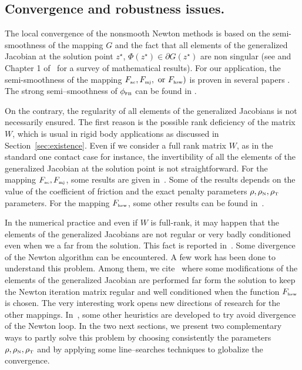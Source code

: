 \subsection{Convergence and robustness issues.}


The local convergence of the nonsmooth Newton methods is based on the semi-smoothness of the mapping $G$ and the fact that all elements of the generalized Jacobian at the solution point $z^\star$,  $\Phi(z^\star) \in \partial G(z^\star)$ are non singular (see \cite{Qi.Sun1993} and Chapter 1 of~\cite{Qi.ea_Book2018} for a survey of mathematical results). For our application, the semi-smoothness of the mapping $F_{\hbox{\tiny{ac}}},  F_{{\hbox{\tiny{mj}}}},  \text{ or } F_{\hbox{\tiny{hsw}}}) $ is proven in several papers \cite{Christensen.Pang1998,Hueber.ea_SJSC2008}. The strong semi--smoothness of $\phi_{\hbox{\tiny{\textsf FB}}}$ can be found in \citep{Sun.Sun_MP2005}.

On the contrary, the regularity of all elements of the generalized Jacobians is not necessarily ensured. The first reason is the possible rank deficiency of the matrix $W$, which is usual in rigid body applications as discussed in Section~\ref{sec:existence}. Even if we consider a full rank matrix $W$, as in the standard one contact case for instance, the invertibility of all the elements of the generalized Jacobian at the solution point is not straightforward. For the mapping $F_{\hbox{\tiny{ac}}},  F_{{\hbox{\tiny{mj}}}}$, some results are given in~\cite{Alart1993,Alart95,Jourdan.Alart.ea98}. Some of the results depends on the value of the coefficient of friction and the exact penalty parameters  $\rho, \rho_{\hbox{\tiny{N}}}, \rho_{\hbox{\tiny{T}}}$ parameters. For the mapping $F_{\hbox{\tiny{hsw}}}$, some other results can be found in~\cite{Hueber.ea_SJSC2008}.

In the numerical practice and even if $W$ is full-rank, it may happen that the elements of the generalized Jacobians are not regular or very badly conditioned even when we a far from the solution. This fact is reported in~\cite{Alart1993,Alart95,Jourdan.Alart.ea98,Hueber.ea_SJSC2008,Koziara.Bicanic_CMAME2008}. Some divergence of the Newton algorithm can be encountered. A few work has been done to understand this problem. Among them, we cite~\cite{Hueber.ea_SJSC2008} where some modifications of the elements of the generalized Jacobian are performed far form the solution to keep the Newton iteration matrix regular and well conditioned when the function $F_{\hbox{\tiny{hsw}}}$ is chosen. The very interesting work opens new directions of research for the other mappings. In~\cite{Koziara.Bicanic_CMAME2008}, some other heuristics are developed to try avoid divergence of the Newton loop. In the two next sections, we present two complementary ways to partly solve this problem by choosing consistently the parameters $\rho, \rho_{\hbox{\tiny{N}}}, \rho_{\hbox{\tiny{T}}}$ and by applying some line--searches techniques to globalize the convergence.


